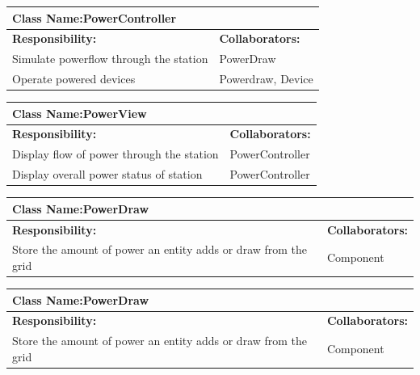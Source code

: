 \documentclass[]{article}
\begin{document}
	\begin{table}[ht]
		\centering
		\begin{tabular}{|p{5cm}|p{5cm}|}
		\hline 
		 \multicolumn{2}{|l|}{\textbf{Class Name:}PowerController} \\
		\hline
		\textbf{Responsibility:} & \textbf{Collaborators:} \\
		\hline 
		Simulate powerflow through the station & PowerDraw \\
		\hline
		Operate powered devices & Powerdraw, Device \\
		\hline
		\end{tabular}	
	\end{table}
	\begin{table}[ht]
		\centering
		\begin{tabular}{|p{5cm}|p{5cm}|}
		\hline 
		 \multicolumn{2}{|l|}{\textbf{Class Name:}PowerView} \\
		\hline
		\textbf{Responsibility:} & \textbf{Collaborators:} \\
		\hline 
		Display flow of power through the station &  PowerController\\
		\hline
		Display overall power status of station &  PowerController\\
		\hline
		\end{tabular}
	\end{table}
	\begin{table}[ht]
		\centering
		\begin{tabular}{|p{5cm}|p{5cm}|}
		\hline 
		 \multicolumn{2}{|l|}{\textbf{Class Name:}PowerDraw} \\
		\hline
		\textbf{Responsibility:} & \textbf{Collaborators:} \\
		\hline 
		Store the amount of power an entity adds or draw from the grid & Component\\
		\hline
		\end{tabular}
	\end{table}
	\begin{table}[ht]
		\centering
		\begin{tabular}{|p{5cm}|p{5cm}|}
		\hline 
		 \multicolumn{2}{|l|}{\textbf{Class Name:}PowerDraw} \\
		\hline
		\textbf{Responsibility:} & \textbf{Collaborators:} \\
		\hline 
		Store the amount of power an entity adds or draw from the grid & Component\\
		\hline
		\end{tabular}
	\end{table}
\end{document}
